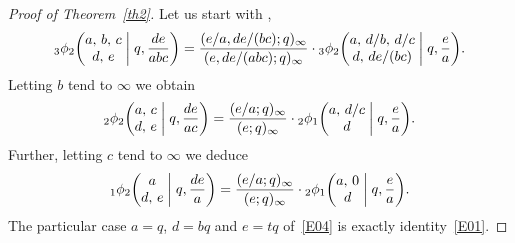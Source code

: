 \documentclass[12pt,reqno]{amsart}
\theoremstyle{remark}
\begin{document}
\begin{proof}[Proof of Theorem~\textup{\ref{th2}}]
Let us start with \cite[Eq.~(III.9)]{GR04},
$$
{}_3\phi_2\biggl(\begin{matrix} a, \, b, \, c \\ d, \, e \end{matrix} \biggm|q,\frac{de}{abc}\biggr)
=\frac{(e/a,de/(bc);q)_\infty}{(e,de/(abc);q)_\infty}
\cdot{}_3\phi_2\biggl(\begin{matrix} a, \, d/b, \, d/c \\ d, \, de/(bc) \end{matrix} \biggm|q,\frac ea\biggr).
$$
Letting $b$ tend to $\infty$ we obtain
\begin{equation}
{}_2\phi_2\biggl(\begin{matrix} a, \, c \\ d, \, e \end{matrix}
\biggm|q,\frac{de}{ac}\biggr)
=\frac{(e/a;q)_\infty}{(e;q)_\infty}
\cdot{}_2\phi_1\biggl(\begin{matrix} a, \, d/c \\ d \end{matrix} \biggm|q,\frac ea\biggr).
\label{E03}
\end{equation}
Further, letting $c$ tend to $\infty$ we deduce
\begin{equation}
{}_1\phi_2\biggl(\begin{matrix}
a \\ d, \, e \end{matrix}
\biggm|q,\frac{de}a\biggr)
=\frac{(e/a;q)_\infty}{(e;q)_\infty}
\cdot{}_2\phi_1\biggl(\begin{matrix}
a, \, 0 \\ d \end{matrix}
\biggm|q,\frac ea\biggr).
\label{E04}
\end{equation}
The particular case $a=q$, $d=bq$ and $e=tq$ of~\eqref{E04} is exactly identity~\eqref{E01}.


\end{proof}
\end{document}
